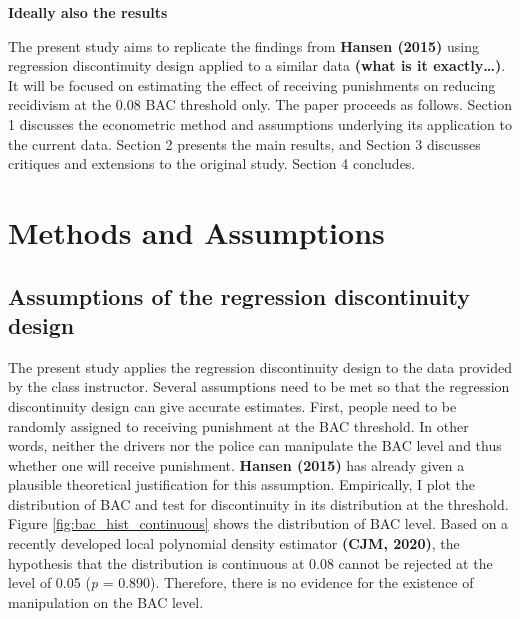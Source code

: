 \documentclass[
  11pt,
]{article}
\begin{document}
\textbf{Ideally also the results}

The present study aims to replicate the findings from \textbf{Hansen
(2015)} using regression discontinuity design applied to a similar data
\textbf{(what is it exactly\ldots)}. It will be focused on estimating
the effect of receiving punishments on reducing recidivism at the 0.08
BAC threshold only. The paper proceeds as follows. Section 1 discusses
the econometric method and assumptions underlying its application to the
current data. Section 2 presents the main results, and Section 3
discusses critiques and extensions to the original study. Section 4
concludes.

\hypertarget{methods-and-assumptions}{%
\section{Methods and Assumptions}\label{methods-and-assumptions}}

\hypertarget{assumptions-of-the-regression-discontinuity-design}{%
\subsection{Assumptions of the regression discontinuity
design}\label{assumptions-of-the-regression-discontinuity-design}}

The present study applies the regression discontinuity design to the
data provided by the class instructor. Several assumptions need to be
met so that the regression discontinuity design can give accurate
estimates. First, people need to be randomly assigned to receiving
punishment at the BAC threshold. In other words, neither the drivers nor
the police can manipulate the BAC level and thus whether one will
receive punishment. \textbf{Hansen (2015)} has already given a plausible
theoretical justification for this assumption. Empirically, I plot the
distribution of BAC and test for discontinuity in its distribution at
the threshold. Figure \ref{fig:bac_hist_continuous} shows the
distribution of BAC level. Based on a recently developed local
polynomial density estimator \textbf{(CJM, 2020)}, the hypothesis that
the distribution is continuous at 0.08 cannot be rejected at the level
of 0.05 (\emph{p} = 0.890). Therefore, there is no evidence for the
existence of manipulation on the BAC level.
\end{document}
